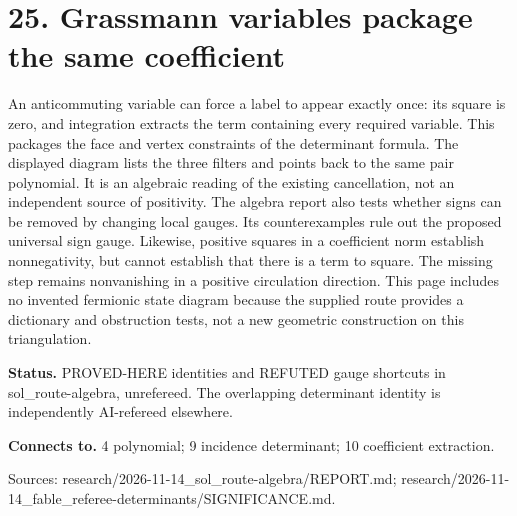 \section*{25. Grassmann variables package the same coefficient}
\begin{center}\begin{minipage}{.86\textwidth}\centering
{}
\end{minipage}\end{center}
An anticommuting variable can force a label to appear exactly once: its square is zero, and integration extracts the term containing every required variable. This packages the face and vertex constraints of the determinant formula. The displayed diagram lists the three filters and points back to the same pair polynomial. It is an algebraic reading of the existing cancellation, not an independent source of positivity. The algebra report also tests whether signs can be removed by changing local gauges. Its counterexamples rule out the proposed universal sign gauge. Likewise, positive squares in a coefficient norm establish nonnegativity, but cannot establish that there is a term to square. The missing step remains nonvanishing in a positive circulation direction. This page includes no invented fermionic state diagram because the supplied route provides a dictionary and obstruction tests, not a new geometric construction on this triangulation.

\textbf{Status.} PROVED-HERE identities and REFUTED gauge shortcuts in sol\_route-algebra, unrefereed. The overlapping determinant identity is independently AI-refereed elsewhere.

\textbf{Connects to.} 4 polynomial; 9 incidence determinant; 10 coefficient extraction.

{\footnotesize\raggedright Sources: research/\allowbreak{}2026-11-14\_sol\_route-algebra/\allowbreak{}REPORT.md;\allowbreak{} research/\allowbreak{}2026-11-14\_fable\_referee-determinants/\allowbreak{}SIGNIFICANCE.md.\par}
